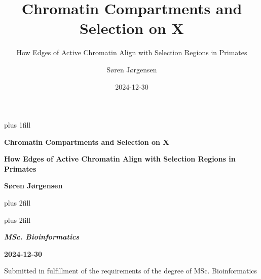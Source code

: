 \documentclass[
  11pt,
  a4paper,
]{scrbook}
\title{Chromatin Compartments and Selection on X}
\subtitle{How Edges of Active Chromatin Align with Selection Regions in
Primates}
\author{Søren Jørgensen}
\date{2024-12-30}
\begin{document}
\frontmatter
\cleardoublepage
\thispagestyle{empty}
{\centering
\hbox{}\vskip 0cm plus 1fill

{%
\Huge\bfseries Chromatin Compartments and Selection on X \par}
\vspace{3ex}
{\Large\bfseries How Edges of Active Chromatin Align with Selection
Regions in Primates \par}
\vspace{6ex}

    {\Large\bfseries Søren Jørgensen \par}
%
\vskip 0cm plus 2fill

{ \par}
\vskip 0cm plus 2fill

{\bfseries\Large\textit{MSc. Bioinformatics} \par}
\vspace{3ex}

{\bfseries\large 2024-12-30 \par}
\vspace{3ex}

\vspace{12ex}
{\small Submitted in fulfillment of the requirements
of the degree of MSc. Bioinformatics \par}
\pagebreak

}
\end{document}
